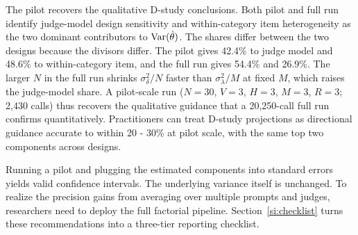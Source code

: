 The pilot recovers the qualitative D-study conclusions. Both pilot and full run identify judge-model design sensitivity and within-category item heterogeneity as the two dominant contributors to $\operatorname{Var}(\hat\theta)$. The shares differ between the two designs because the divisors differ. The pilot gives 42.4\% to judge model and 48.6\% to within-category item, and the full run gives 54.4\% and 26.9\%. The larger $N$ in the full run shrinks $\sigma^2_\delta/N$ faster than $\sigma^2_\lambda/M$ at fixed $M$, which raises the judge-model share. A pilot-scale run ($N = 30$, $V = 3$, $H = 3$, $M = 3$, $R = 3$; 2,430 calls) thus recovers the qualitative guidance that a 20,250-call full run confirms quantitatively. Practitioners can treat D-study projections as directional guidance accurate to within 20 - 30\% at pilot scale, with the same top two components across designs.

Running a pilot and plugging the estimated components into standard errors yields valid confidence intervals. The underlying variance itself is unchanged. To realize the precision gains from averaging over multiple prompts and judges, researchers need to deploy the full factorial pipeline. Section~\ref{si:checklist} turns these recommendations into a three-tier reporting checklist.

